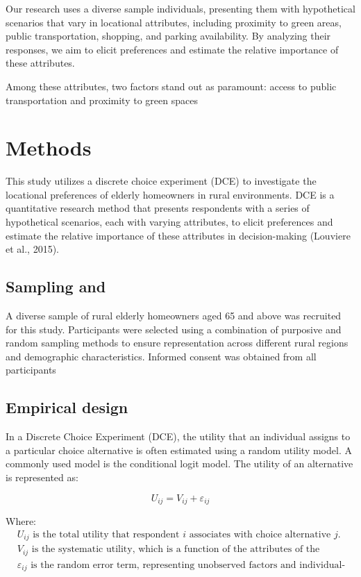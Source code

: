 \documentclass[3p,12pt ]{elsarticle}
\begin{document}
Our research uses a diverse sample individuals, presenting them with hypothetical scenarios that vary in locational attributes, including proximity to green areas, public transportation, shopping, and parking availability.
By analyzing their responses, we aim to elicit preferences and estimate the relative importance of these attributes.

Among these attributes, two factors stand out as paramount: access to public transportation and proximity to green spaces 

\section{Methods}

This study utilizes a discrete choice experiment (DCE) to investigate the locational preferences of elderly homeowners in rural environments. DCE is a quantitative research method that presents respondents with a series of hypothetical scenarios, each with varying attributes, to elicit preferences and estimate the relative importance of these attributes in decision-making (Louviere et al., 2015).

\subsection{Sampling and }

A diverse sample of rural elderly homeowners aged 65 and above was recruited for this study. Participants were selected using a combination of purposive and random sampling methods to ensure representation across different rural regions and demographic characteristics. Informed consent was obtained from all participants

\subsection{Empirical design}

In a Discrete Choice Experiment (DCE), the utility that an individual assigns to a particular choice alternative is often estimated using a random utility model. A commonly used model is the conditional logit model. The utility of an alternative is represented as:

\begin{equation}
U_{ij} = V_{ij} + \varepsilon_{ij}
\end{equation}

Where:
\begin{align*}
&U_{ij} \text{ is the total utility that respondent } i \text{ associates with choice alternative } j. \\
&V_{ij} \text{ is the systematic utility, which is a function of the attributes of the alternative and the preferences of the respondent.} \\
&\varepsilon_{ij} \text{ is the random error term, representing unobserved factors and individual-specific preferences. It is assumed to follow an independent and identically distributed extreme value Type I (Gumbel) distribution.}
\end{align*}
\end{document}

